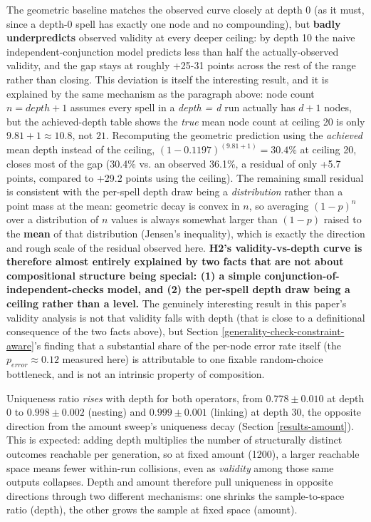 \documentclass[]{article}
\begin{document}
        The geometric baseline matches the observed curve closely at depth 0 (as it must, since a depth-0 spell has exactly one node and no compounding), but \textbf{badly underpredicts} observed validity at every deeper ceiling: by depth 10 the naive independent-conjunction model predicts less than half the actually-observed validity, and the gap stays at roughly +25-31 points across the rest of the range rather than closing. This deviation is itself the interesting result, and it is explained by the same mechanism as the paragraph above: node count $n = depth + 1$ assumes every spell in a \textit{depth = d} run actually has $d + 1$ nodes, but the achieved-depth table shows the \textit{true} mean node count at ceiling 20 is only $9.81 + 1 \approx 10.8$, not $21$. Recomputing the geometric prediction using the \textit{achieved} mean depth instead of the ceiling, $(1 - 0.1197)^(9.81+1) = 30.4\%$ at ceiling 20, closes most of the gap (30.4\% vs. an observed 36.1\%, a residual of only +5.7 points, compared to +29.2 points using the ceiling). The remaining small residual is consistent with the per-spell depth draw being a \textit{distribution} rather than a point mass at the mean: geometric decay is convex in $n$, so averaging $(1-p)^n$ over a distribution of $n$ values is always somewhat larger than $(1-p)$ raised to the \textbf{mean} of that distribution (Jensen's inequality), which is exactly the direction and rough scale of the residual observed here. \textbf{H2's validity-vs-depth curve is therefore almost entirely explained by two facts that are not about compositional structure being special: (1) a simple conjunction-of-independent-checks model, and (2) the per-spell depth draw being a ceiling rather than a level.} The genuinely interesting result in this paper's validity analysis is not that validity falls with depth (that is close to a definitional consequence of the two facts above), but Section \ref{generality-check-constraint-aware}'s finding that a substantial share of the per-node error rate itself (the $p_{error} \approx 0.12$ measured here) is attributable to one fixable random-choice bottleneck, and is not an intrinsic property of composition.

        Uniqueness ratio \textit{rises} with depth for both operators, from $0.778 \pm 0.010$ at depth 0 to $0.998 \pm 0.002$ (nesting) and $0.999 \pm 0.001$ (linking) at depth 30, the opposite direction from the amount sweep's uniqueness decay (Section \ref{results-amount}). This is expected: adding depth multiplies the number of structurally distinct outcomes reachable per generation, so at fixed amount (1200), a larger reachable space means fewer within-run collisions, even as \textit{validity} among those same outputs collapses. Depth and amount therefore pull uniqueness in opposite directions through two different mechanisms: one shrinks the sample-to-space ratio (depth), the other grows the sample at fixed space (amount).
\end{document}
